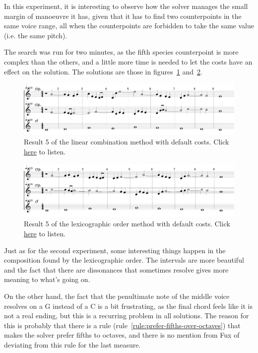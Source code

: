 In this experiment, it is interesting to observe how the solver manages the small margin of manoeuvre it has, given that it has to find two counterpoints in the same voice range, all when the counterpoints are forbidden to take the same value (i.e. the same pitch).

The search was run for two minutes, as the fifth species counterpoint is more complex than the others, and a little more time is needed to let the costs have an effect on the solution. The solutions are those in figures~\ref{fig:combili-5sp} and~\ref{fig:lexico-5sp}.

\begin{figure}[h]
    \centering
    \includegraphics[width=1\textwidth]{Images/Experiments/linear-combination-5sp.png}
    \caption{Result 5 of the linear combination method with default costs. Click \href{https://youtu.be/Lyi2Tv0eto8}{here} to listen.}
    \label{fig:combili-5sp}
\end{figure}

\begin{figure}[h]
    \centering
    \includegraphics[width=1\textwidth]{Images/Experiments/basic-lexico-5sp.png}
    \caption{Result 5 of the lexicographic order method with default costs. Click \href{https://youtu.be/wYq28XcmpVw}{here} to listen.}
    \label{fig:lexico-5sp}
\end{figure}

Just as for the second experiment, some interesting things happen in the composition found by the lexicographic order. The intervals are more beautiful and the fact that there are dissonances that sometimes resolve gives more meaning to what's going on.

On the other hand, the fact that the penultimate note of the middle voice resolves on a G instead of a C is a bit frustrating, as the final chord feels like it is not a real ending, but this is a recurring problem in all solutions. The reason for this is probably that there is a rule (rule~\ref{rule:prefer-fifths-over-octaves}) that makes the solver prefer fifths to octaves, and there is no mention from Fux of deviating from this rule for the last measure.

